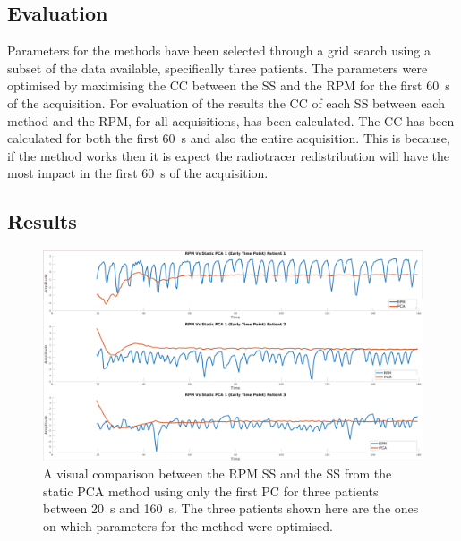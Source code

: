             \subsection{Evaluation} \label{sec:pca_data_driven_surrogate_signal_extraction_methods_for_dynamic_pet_methods_evaluation}
                Parameters for the methods have been selected through a grid search using a subset of the data available, specifically three patients. The parameters were optimised by maximising the \gls{CC} between the \gls{SS} and the \gls{RPM} for the first \SI{60}{\second} of the acquisition. For evaluation of the results the \gls{CC} of each \gls{SS} between each method and the \gls{RPM}, for all acquisitions, has been calculated. The \gls{CC} has been calculated for both the first \SI{60}{\second} and also the entire acquisition. This is because, if the method works then it is expect the radiotracer redistribution will have the most impact in the first \SI{60}{\second} of the acquisition.
            
        \subsection{Results} \label{sec:pca_data_driven_surrogate_signal_extraction_methods_for_dynamic_pet_results}
            \begin{figure}
                \centering
                
                \includegraphics[width=1.0\linewidth]{figures/data_driven_surrogate_signal_extraction_results_1_vanilla_surrogate_signal.png}
                
                \captionsetup{singlelinecheck=false, justification=centering}
                \caption{A visual comparison between the \gls{RPM} \gls{SS} and the \gls{SS} from the static \gls{PCA} method using only the first \gls{PC} for three patients between \SI{20}{\second} and \SI{160}{\second}. The three patients shown here are the ones on which parameters for the method were optimised.}
                \label{fig:pca_data_driven_surrogate_signal_extraction_methods_for_dynamic_pet_results_vanilla_surrogate_signal}
            \end{figure}
            
